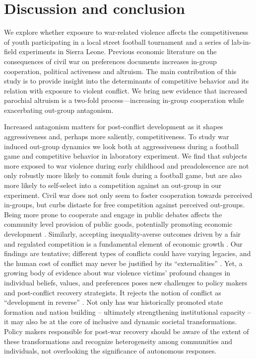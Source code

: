 \section{Discussion and conclusion}
\label{sec:slf:discussion}
We explore whether exposure to war-related violence affects the competitiveness of youth participating in a local street football tournament and a series of lab-in-field experiments in Sierra Leone. Previous economic literature on the consequences of civil war on preferences documents increases in-group cooperation, political activeness and altruism. The main contribution of this study is to provide insight into the determinants of competitive behavior and its relation with exposure to violent conflict. We bring new evidence that increased parochial altruism is a two-fold process—increasing in-group cooperation while exacerbating out-group antagonism. 

Increased antagonism matters for post-conflict development as it shapes aggressiveness and, perhaps more saliently, competitiveness. To study war induced out-group dynamics we look both at aggressiveness during a football game and competitive behavior in laboratory experiment. We find that subjects more exposed to war violence during early childhood and preadolescence are not only robustly more likely to commit fouls during a football game, but are also more likely to self-select into a competition against an out-group in our experiment. Civil war does not only seem to foster cooperation towards perceived in-groups, but curbs distaste for free competition against perceived out-groups. Being more prone to cooperate and engage in public debates affects the community level provision of public goods, potentially promoting economic development \citep{Bellows2009b}. Similarly, accepting inequality-averse outcomes driven by a fair and regulated competition is a fundamental element of economic growth \citep{Bartling2009b}
. 
Our findings are tentative; different types of conflicts could have varying legacies, and the human cost of conflict may never be justified by its ``externalities'' \citep{CassarAlessandra}. Yet, a growing body of evidence about war violence victims’ profound changes in individual beliefs, values, and preferences poses new challenges to policy makers and post-conflict recovery strategists. It rejects the notion of conflict as ``development in reverse'' \cite{Collier2003}. Not only has war historically promoted state formation and nation building – ultimately strengthening institutional capacity \citep{Tilly1975} -- it may also be at the core of inclusive and dynamic societal transformations. Policy makers responsible for post-war recovery should be aware of the extent of these transformations and recognize heterogeneity among communities and individuals, not overlooking the significance of autonomous responses.




